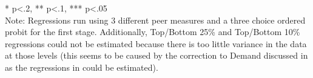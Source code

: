 \begin{sidewaystable}[htb]
\begin{threeparttable}
\begin{tabular}{l|c|c|c|c|c|c|c|c}
      \hline
      \hline
    \end{tabular}
    \begin{tablenotes}
    \item{* p<.2, ** p<.1, *** p<.05 \\Note: Regressions run using 3 different peer measures and a three choice ordered probit for the first stage. Additionally, Top/Bottom 25\% and Top/Bottom 10\% regressions could not be estimated because there is too little variance in the data at those levels (this seems to be caused by the correction to Demand discussed in  as the regressions in  could be estimated).}
    \end{tablenotes}
  \end{threeparttable}
\end{sidewaystable}

